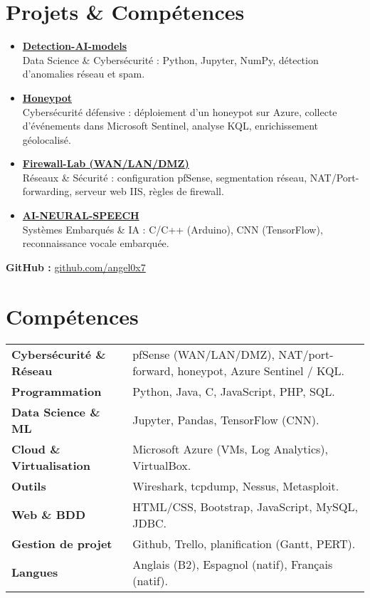 \documentclass[a4paper,10pt]{article}
\begin{document}
\section*{Projets \& Compétences}

\begin{itemize}[leftmargin=*]
  \item \href{https://github.com/angel0x7/Detection-AI-models-}{\textbf{Detection-AI-models}} \\
  Data Science \& Cybersécurité : Python, Jupyter, NumPy, détection d’anomalies réseau et spam.

  \item \href{https://github.com/angel0x7/Honeypot-}{\textbf{Honeypot}} \\
  Cybersécurité défensive : déploiement d’un honeypot sur Azure, collecte d’événements dans Microsoft Sentinel, analyse KQL, enrichissement géolocalisé.

  \item \href{https://github.com/angel0x7/Firewall-Lab-WAN-LAN-DMZ-}{\textbf{Firewall-Lab (WAN/LAN/DMZ)}} \\
  Réseaux \& Sécurité : configuration pfSense, segmentation réseau, NAT/Port-forwarding, serveur web IIS, règles de firewall.

  \item \href{https://github.com/angel0x7/AI-NEURAL-SPEECH-}{\textbf{AI-NEURAL-SPEECH}} \\
  Systèmes Embarqués \& IA : C/C++ (Arduino), CNN (TensorFlow), reconnaissance vocale embarquée.


\end{itemize}

\noindent
\textbf{GitHub :} \href{https://github.com/angel0x7}{github.com/angel0x7}


\section*{Compétences}

\begin{tabular}{p{5cm} p{15cm}}
\textbf{Cybersécurité \& Réseau} & pfSense (WAN/LAN/DMZ), NAT/port-forward, honeypot, Azure Sentinel / KQL. \\
\textbf{Programmation} & Python, Java, C, JavaScript, PHP, SQL. \\
\textbf{Data Science \& ML} & Jupyter, Pandas, TensorFlow (CNN). \\
\textbf{Cloud \& Virtualisation} & Microsoft Azure (VMs, Log Analytics), VirtualBox. \\
\textbf{Outils} & Wireshark, tcpdump, Nessus, Metasploit. \\
\textbf{Web \& BDD} & HTML/CSS, Bootstrap, JavaScript, MySQL, JDBC. \\
\textbf{Gestion de projet} & Github, Trello, planification (Gantt, PERT). \\
\textbf{Langues} & Anglais (B2), Espagnol (natif), Français (natif). \\
\end{tabular}
\end{document}
